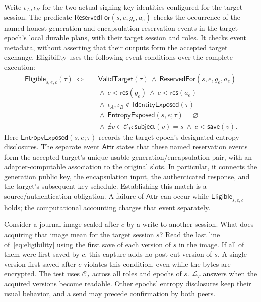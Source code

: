 \documentclass[pdflatex]{sn-jnl}
\theoremstyle{thmstyleone}
\theoremstyle{thmstylethree}
\theoremstyle{thmstyletwo}
\begin{document}
Write $\iota_A,\iota_B$ for the two actual signing-key identities configured
for the target session.  The predicate
$\mathsf{ReservedFor}(s,e,g_e,a_e)$ checks the occurrence of the named honest
generation and encapsulation reservation events in the target epoch's local
durable plans, with their target session and roles.  It checks event metadata,
without asserting that their outputs form the accepted target exchange.
Eligibility uses the following event conditions over the complete execution:
\begin{align}
 \mathsf{Eligible}_{s,e,c}(\tau)\ \Longleftrightarrow\quad&
 \mathsf{ValidTarget}(\tau)
 \ \wedge\ \mathsf{ReservedFor}(s,e,g_e,a_e)
 \nonumber\\[-1mm]
 &{}\wedge\ c<\mathsf{res}(g_e)
          \ \wedge\ c<\mathsf{res}(a_e)
 \nonumber\\
 &{}\wedge\ \iota_A,\iota_B
                  \notin\mathsf{IdentityExposed}(\tau)
 \nonumber\\
 &{}\wedge\ \mathsf{EntropyExposed}(s,e;\tau)=\varnothing
 \nonumber\\
 &{}\wedge\ \nexists v\in\mathcal C_T:
       \mathsf{subject}(v)=s\ \wedge\ c<\mathsf{save}(v).
 \label{eq:eligibility}
\end{align}
Here $\mathsf{EntropyExposed}(s,e;\tau)$ records the target epoch's designated
entropy disclosures.  The separate event $\mathsf{Attr}$ states that these
named reservation events form the accepted target's unique usable
generation/encapsulation pair, with an adapter-computable association to the
original slots.  In particular, it connects the generation public key, the
encapsulation input, the authenticated response, and the target's subsequent
key schedule. Establishing this match is a source/authentication obligation.
A failure of $\mathsf{Attr}$ can occur while
$\mathsf{Eligible}_{s,e,c}$ holds; the computational accounting charges
that event separately.

Consider a journal image sealed after $c$ by a write to another session.
What does acquiring that image mean for the target session $s$? Read the
last line of~\eqref{eq:eligibility} using the first save of each version
of $s$ in the image. If all of them were first saved by $c$, this
capture adds no post-cut version of $s$. A single version first
saved after $c$ violates this condition, even while the bytes are encrypted. The
test uses $\mathcal C_T$ across all roles and epochs of $s$.
$\mathcal L_T$ answers when the acquired versions become readable.
Other epochs' entropy disclosures keep their usual behavior, and a send
may precede confirmation by both peers.
\end{document}
